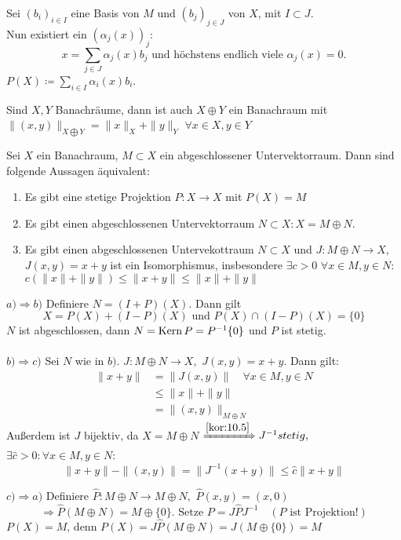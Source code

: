\begin{beweis}
	Sei $(b_{i})_{i \in I}$ eine Basis von $M$ und $(b_{j})_{j \in J}$ von $X$, mit $I \subset J$. \\
	Nun existiert ein $(\alpha_{j}(x))_{j}$:
	\[ x = \sum_{j \in J} \alpha_{j}(x) b_{j} \text{ und höchstens endlich viele } \alpha_{j}(x) = 0. \]
	$P(X) \coloneqq \sum_{i \in I} \alpha_{i}(x) b_{i}$.
\end{beweis}


\begin{erinnerung}
	Sind $X, Y$ Banachräume, dann ist auch $X \oplus Y$ ein Banachraum mit $\| (x, y) \|_{X \bigoplus Y} = \| x \|_{X} + \| y \|_{Y}$ $\forall x \in X, y \in Y$
\end{erinnerung}


\begin{satz} \label{satz:11.4}
	Sei $X$ ein Banachraum, $M \subset X$ ein abgeschlossener Untervektorraum. Dann sind folgende Aussagen äquivalent:
	\begin{enumerate}[label=\alph*\upshape)]
		\item Es gibt eine stetige Projektion $P \colon X \rightarrow X$ mit $P(X) = M$
		\item Es gibt einen abgeschlossenen Untervektorraum $N \subset X: X = M \oplus N$.
		\item Es gibt einen abgeschlossenen Untervekottraum $N \subset X$ und $J: M \oplus N \rightarrow X,$ $J(x, y) = x + y$ ist ein Isomorphismus, insbesondere $\exists c > 0$ $\forall x \in M, y \in N:$ $c \left( \|x \| + \|y \| \right) \leq \|x + y \| \leq \|x \| + \| y \| $
	\end{enumerate}
\end{satz}

\begin{beweis}
	$a) \Rightarrow b)$ Definiere $N = (I + P)(X)$. Dann gilt
		\[ X = P(X) + (I - P)(X) \text{ und } P(X) \cap (I - P)(X) = \{ 0 \} \]
		$N$ ist abgeschlossen, dann $N = \mathop{\rm Kern}\nolimits{P} = P^{-1}\{ 0 \}$ und $P$ ist stetig.	\\ \\
	$b) \Rightarrow c)$ Sei $N$ wie in $b)$. $J: M \oplus N \rightarrow X,$ $J(x, y) = x + y$. Dann gilt:
		\begin{align*}
			\| x + y \| & = \| J(x, y) \| \quad \forall x \in M, y \in N \\
						& \leq \| x \| + \| y \| \\
						& = \| (x, y) \|_{M \oplus N}
		\end{align*}
		Au{\ss}erdem ist $J$ bijektiv, da $X = M \oplus N$
		$\xRightarrow[]{\ref{kor:10.5}} J^{-1} stetig,$ $\exists \hat{c} > 0: \forall x \in M, y \in N$:
		\[ \| x + y \| - \| (x, y) \| = \| J^{-1}(x + y) \| \leq \hat{c} \| x + y \| \]

	$c) \Rightarrow a)$ Definiere $\hat{P} \colon M \oplus N \rightarrow M \oplus N,$ $\hat{P}(x, y) = (x, 0)$
		\[ \Rightarrow \hat{P}(M \oplus N) = M \oplus \{ 0 \}. \text{ Setze } P = J \hat{P} J^{-1} \quad (P \text{ ist Projektion!}) \]
		$P(X) = M$, denn $P(X) = J \hat{P}(M \oplus N) = J (M \oplus \{ 0 \}) = M$
\end{beweis}


